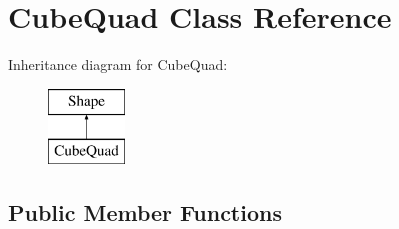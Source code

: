 \hypertarget{class_cube_quad}{}\section{Cube\+Quad Class Reference}
\label{class_cube_quad}
Inheritance diagram for Cube\+Quad\+:\begin{figure}[H]
\begin{center}
\leavevmode
\includegraphics[height=2.000000cm]{class_cube_quad}
\end{center}
\end{figure}
\subsection*{Public Member Functions}
